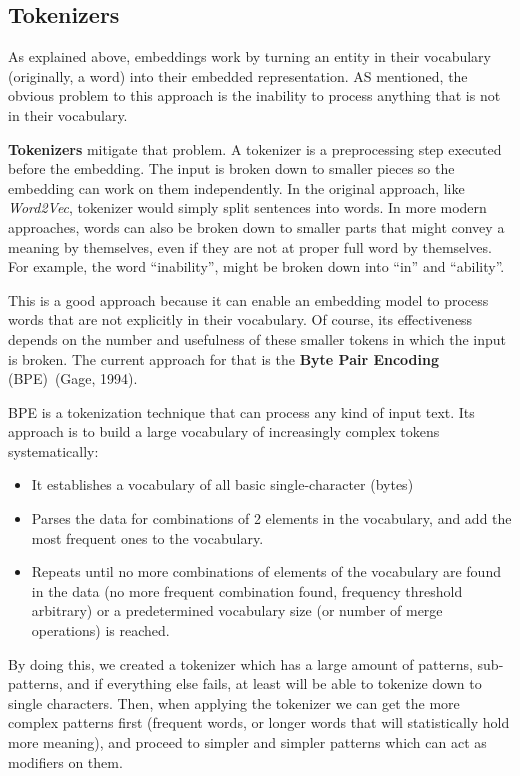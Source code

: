 \documentclass[a4paper, 11pt]{report}
\begin{document}
\subsection{Tokenizers}\label{Theory: Tokenizers}
As explained above, embeddings work by turning an entity in their vocabulary (originally, a word) into their embedded representation. AS mentioned, the obvious problem to this approach is the inability to process anything that is not in their vocabulary.

\textbf{Tokenizers} mitigate that problem. A tokenizer is a preprocessing step executed before the embedding. The input is broken down to smaller pieces so the embedding can work on them independently. In the original approach, like \textit{Word2Vec}, tokenizer would simply split sentences into words. In more modern approaches, words can also be broken down to smaller parts that might convey a meaning by themselves, even if they are not at proper full word by themselves. For example, the word ``inability'', might be broken down into ``in'' and ``ability''.

This is a good approach because it can enable an embedding model to process words that are not explicitly in their vocabulary. Of course, its effectiveness depends on the number and usefulness of these smaller tokens in which the input is broken. The current approach for that is the \textbf{Byte Pair Encoding} (BPE)~\cite{Gage1994_BPE}(Gage, 1994).

BPE is a tokenization technique that can process any kind of input text. Its approach is to build a large vocabulary of increasingly complex tokens systematically:
\begin{itemize}
    \item It establishes a vocabulary of all basic single-character (bytes)
    \item Parses the data for combinations of 2 elements in the vocabulary, and add the most frequent ones to the vocabulary.
    \item Repeats until no more combinations of elements of the vocabulary are found in the data (no more frequent combination found, frequency threshold arbitrary) or a predetermined vocabulary size (or number of merge operations) is reached.
\end{itemize}
By doing this, we created a tokenizer which has a large amount of patterns, sub-patterns, and if everything else fails, at least will be able to tokenize down to single characters. Then, when applying the tokenizer we can get the more complex patterns first (frequent words, or longer words that will statistically hold more meaning), and proceed to simpler and simpler patterns which can act as modifiers on them.
\end{document}
